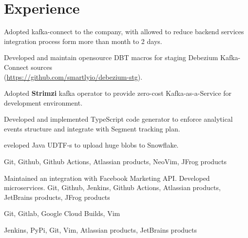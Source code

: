 \documentclass{cv}
\begin{document}
\section* {Experience}
    \begin{gaas}
      \item Adopted kafka-connect to the company, with allowed to reduce
        backend services integration process form more than month to 2 days.
      \item Developed and maintain opensource DBT macros for staging Debezium
        Kafka-Connect sources \\
        (\href{https://github.com/smartlyio/debezium-stg}{https://github.com/smartlyio/debezium-stg}).
      \item Adopted \textbf{Strimzi} kafka operator to provide zero-cost
        Kafka-as-a-Service for development environment.
      \item Developed and implemented TypeScript code generator to enforce
        analytical events structure and integrate with Segment tracking plan.
      \item eveloped Java UDTF-s to upload huge blobs to Snowflake.
    \end{gaas}
    \devtools
      Git, Github, Github Actions, Atlassian products, NeoVim, JFrog products

    Maintained an integration with Facebook Marketing API. Developed
    microservices.
    \devtools
      Git, Github, Jenkins, Github Actions, Atlassian products, JetBrains
      products, JFrog products

    \devtools
      Git, Gitlab, Google Cloud Builds, Vim

    \devtools
      Jenkins, PyPi, Git, Vim, Atlassian products, JetBrains products
  \pagebreak
\end{document}
